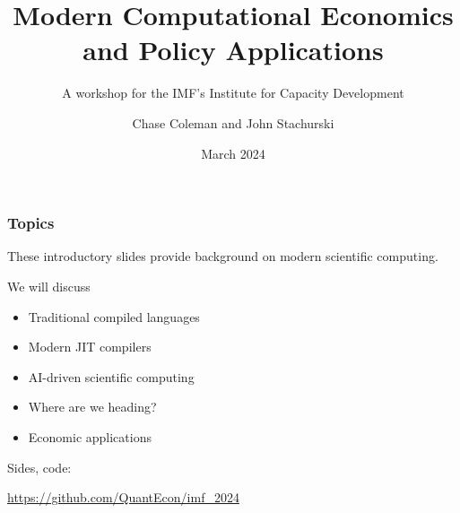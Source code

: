 \documentclass[
    xcolor={svgnames,dvipsnames},
    hyperref={colorlinks, citecolor=DeepPink4, linkcolor=DarkRed, urlcolor=DarkBlue}
    ]{beamer}  %
\title{Modern Computational Economics \\ and Policy Applications}
\subtitle{A workshop for the IMF's Institute for Capacity Development}
\author{Chase Coleman and John Stachurski}
\date{March 2024}
\newcommand{\1}{\mathbbm 1}
\begin{document}
\begin{frame}
  \titlepage
\end{frame}







\begin{frame}
    \frametitle{Topics}

    These introductory slides provide background on modern scientific computing.

        \vspace{0.5em}
    We will discuss

    \begin{itemize}
        \item Traditional compiled languages
        \vspace{0.5em}
        \item Modern JIT compilers
        \vspace{0.5em}
        \item AI-driven scientific computing
        \vspace{0.5em}
        \item Where are we heading?
        \vspace{0.5em}
        \item Economic applications
    \end{itemize}

\end{frame}


\begin{frame}
    
    Sides, code:

    \url{https://github.com/QuantEcon/imf_2024}

\end{frame}
\end{document}

